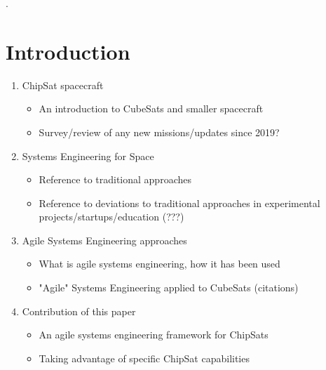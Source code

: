 \documentclass[]{iac}
\begin{document}
\maketitle
\printglossary[type=\acronymtype, title=Abbreviations]
\printglossary[title=Nomenclature]

\newpage
.

\pagebreak[4]
\newpage


\section{Introduction}
    \begin{enumerate}
        \item ChipSat spacecraft
        \begin{itemize}
            \item An introduction to CubeSats and smaller spacecraft \autocite{hein_attosats_2019}
            \item Survey/review of any new missions/updates since 2019? \autocite{adams_theory_2020}
        \end{itemize}
        \item Systems Engineering for Space
        \begin{itemize}
            \item Reference to traditional approaches \autocite{shea_nasa_2017, ecss_ecss-e-st-10c_nodate}
            \item Reference to deviations to traditional approaches in experimental projects/startups/education (???)
        \end{itemize}
        \item Agile Systems Engineering approaches
        \begin{itemize}
            \item What is agile systems engineering, how it has been used \autocite{douglass_agile_2015, haberfellner_agile_2005}
            \item "Agile" Systems Engineering applied to CubeSats (citations)
        \end{itemize}
        \item Contribution of this paper
        \begin{itemize}
            \item An agile systems engineering framework for ChipSats
            \item Taking advantage of specific ChipSat capabilities \autocite{hein_attosats_2019}
        \end{itemize}
    \end{enumerate}
\end{document}
